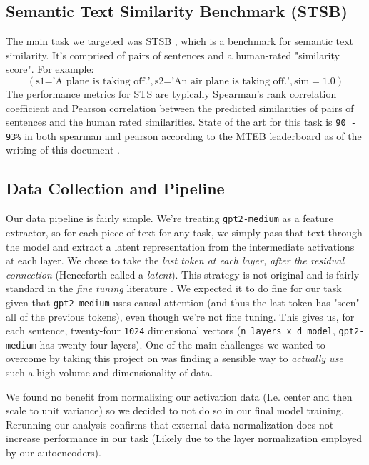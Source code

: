\documentclass{article}
\begin{document}
\subsection{Semantic Text Similarity Benchmark (STSB)} \label{STS-section}
The main task we targeted was STSB \cite{STS}, which is a benchmark for semantic text similarity. It's comprised of pairs of sentences and a human-rated "similarity score". For example:
$$
(\text{s1='A plane is taking off.'}, \text{s2='An air plane is taking off.'}, \text{sim}=1.0)
$$
The performance metrics for STS are typically Spearman's rank correlation coefficient and Pearson correlation between the predicted similarities of pairs of sentences and the human rated similarities. State of the art for this task is \verb|90 - 93%| in both spearman and pearson according to the MTEB leaderboard as of the writing of this document \cite{muennighoff2022mteb}.

\subsection{Data Collection and Pipeline} \label{latent}
Our data pipeline is fairly simple. We're treating \verb|gpt2-medium| as a feature extractor, so for each piece of text for any task, we simply pass that text through the model and extract a latent representation from the intermediate activations at each layer. We chose to take the \textit{last token at each layer, after the residual connection} (Henceforth called a \textit{latent}). This strategy is not original and is fairly standard in the \textit{fine tuning} literature \cite{LLMEmbed}. We expected it to do fine for our task given that \verb|gpt2-medium| uses causal attention (and thus the last token has "seen" all of the previous tokens), even though we're not fine tuning. This gives us, for each sentence, twenty-four \verb|1024| dimensional vectors (\verb|n_layers x d_model|, \verb|gpt2-medium| has twenty-four layers). One of the main challenges we wanted to overcome by taking this project on was finding a sensible way to \textit{actually use} such a high volume and dimensionality of data.

We found no benefit from normalizing our activation data (I.e. center and then scale to unit variance) so we decided to not do so in our final model training. Rerunning our analysis confirms that external data normalization does not increase performance in our task (Likely due to the layer normalization employed by our autoencoders).
\end{document}
